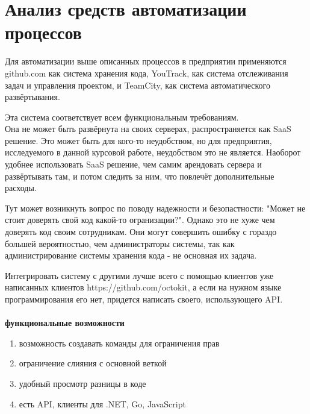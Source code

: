 \documentclass{article}
\begin{document}
\pagebreak


\section{Анализ средств автоматизации процессов}


Для автоматизации выше описанных процессов в предприятии применяются github.com как система хранения кода,
YouTrack, как система отслеживания задач и управления проектом, и TeamCity, как система автоматического развёртывания.


Эта система соответствует всем функциональным требованиям.\\
Она не может быть развёрнута на своих серверах, распространяется как SaaS решение.
Это может быть для кого-то неудобством, но для предприятия, исследуемого в данной курсовой работе, неудобством это не является.
Наоборот удобнее использовать SaaS решение, чем самим арендовать сервера и развёртывать там, и потом следить за ним, что повлечёт дополнительные расходы.

Тут может возникнуть вопрос по поводу надежности и безопастности: "Может не стоит доверять свой код какой-то огранизации?". Однако это не хуже
чем доверять код своим сотрудникам. Они могут совершить ошибку с гораздо большей вероятностью, чем администраторы системы, так как администрирование
системы хранения кода - не основная их задача.

Интегрировать систему с другими лучше всего с помощью клиентов уже написанных клиентов https://github.com/octokit, а если на нужном языке программирования его нет,
придется написать своего, использующего API.
\\\\
\textbf{функциональные возможности}
\begin{enumerate}
    \item{возможность создавать команды для ограничения прав}
    \item{ограничение слияния с основной веткой}
    \item{удобный просмотр разницы в коде}
    \item{есть API, клиенты для .NET, Go, JavaScript}
\end{enumerate}
\end{document}

